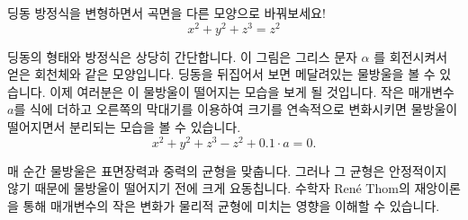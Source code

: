 ﻿\begin{surferPage}{딩동}
방정식을 변형하면서 곡면을 다른 모양으로 바꿔보세요!\\

\smallskip
\[x^2	+ y^2	+ z^3	= z^2\]

\singlespacing
딩동의 형태와 방정식은 상당히 간단합니다. 이 그림은 그리스 문자  $\alpha$ 를 회전시켜서 얻은 회천체와 같은 모양입니다. 딩동을 뒤집어서 보면 메달려있는 물방울을 볼 수 있습니다. 이제 여러분은 이 물방울이 떨어지는 모습을 보게 될 것입니다. 
\newline
작은 매개변수 $a$를 식에 더하고 오른쪽의 막대기를 이용하여 크기를 연속적으로 변화시키면 물방울이 떨어지면서 분리되는 모습을 볼 수 있습니다.  
\[x^2	+ y^2	+ z^3	-z^2+0.1\cdot a=0.\]

매 순간 물방울은 표면장력과 중력의 균형을 맞춥니다. 그러나 그 균형은 안정적이지 않기 때문에 물방울이 떨어지기 전에 크게 요동칩니다. 수학자 Ren\'e Thom의 재앙이론을 통해 매개변수의 작은 변화가 물리적 균형에 미치는 영향을 이해할 수 있습니다. 
\end{surferPage}
